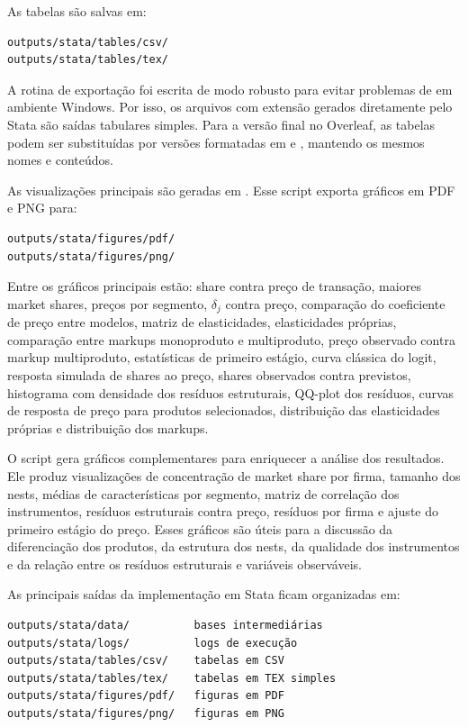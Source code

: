 \documentclass[12pt,a4paper]{article}
\begin{document}
As tabelas são salvas em:

\begin{verbatim}
outputs/stata/tables/csv/
outputs/stata/tables/tex/
\end{verbatim}

A rotina de exportação foi escrita de modo robusto para evitar problemas de  em ambiente Windows. Por isso, os arquivos com extensão  gerados diretamente pelo Stata são saídas tabulares simples. Para a versão final no Overleaf, as tabelas podem ser substituídas por versões formatadas em  e , mantendo os mesmos nomes e conteúdos.

As visualizações principais são geradas em . Esse script exporta gráficos em PDF e PNG para:

\begin{verbatim}
outputs/stata/figures/pdf/
outputs/stata/figures/png/
\end{verbatim}

Entre os gráficos principais estão: share contra preço de transação, maiores market shares, preços por segmento, $\delta_j$ contra preço, comparação do coeficiente de preço entre modelos, matriz de elasticidades, elasticidades próprias, comparação entre markups monoproduto e multiproduto, preço observado contra markup multiproduto, estatísticas de primeiro estágio, curva clássica do logit, resposta simulada de shares ao preço, shares observados contra previstos, histograma com densidade dos resíduos estruturais, QQ-plot dos resíduos, curvas de resposta de preço para produtos selecionados, distribuição das elasticidades próprias e distribuição dos markups.

O script  gera gráficos complementares para enriquecer a análise dos resultados. Ele produz visualizações de concentração de market share por firma, tamanho dos nests, médias de características por segmento, matriz de correlação dos instrumentos, resíduos estruturais contra preço, resíduos por firma e ajuste do primeiro estágio do preço. Esses gráficos são úteis para a discussão da diferenciação dos produtos, da estrutura dos nests, da qualidade dos instrumentos e da relação entre os resíduos estruturais e variáveis observáveis.

As principais saídas da implementação em Stata ficam organizadas em:

\begin{verbatim}
outputs/stata/data/          bases intermediárias
outputs/stata/logs/          logs de execução
outputs/stata/tables/csv/    tabelas em CSV
outputs/stata/tables/tex/    tabelas em TEX simples
outputs/stata/figures/pdf/   figuras em PDF
outputs/stata/figures/png/   figuras em PNG
\end{verbatim}
\end{document}
